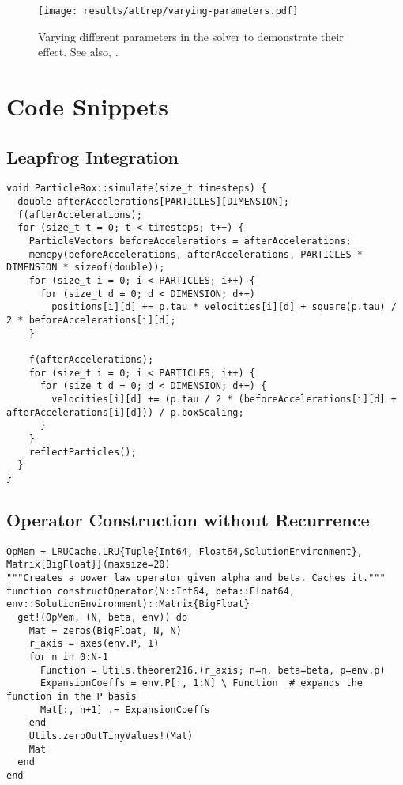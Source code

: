 \pagebreak
\begin{figure}[H]
  \centering
  \texttt{[image: results/attrep/varying-parameters.pdf]}
  \caption[Varying parameters in the solver]{
    Varying different parameters in the solver to demonstrate their effect.
    See also, .
  }
  \label{fig:varying-parameters}
\end{figure}
\pagebreak

\chapter{Code Snippets}
\label{appendix:code-snippets}

\section{Leapfrog Integration}
\begin{verbatim}
void ParticleBox::simulate(size_t timesteps) {
  double afterAccelerations[PARTICLES][DIMENSION];
  f(afterAccelerations);
  for (size_t t = 0; t < timesteps; t++) {
    ParticleVectors beforeAccelerations = afterAccelerations;
    memcpy(beforeAccelerations, afterAccelerations, PARTICLES * DIMENSION * sizeof(double));
    for (size_t i = 0; i < PARTICLES; i++) {
      for (size_t d = 0; d < DIMENSION; d++)
        positions[i][d] += p.tau * velocities[i][d] + square(p.tau) / 2 * beforeAccelerations[i][d];
    }

    f(afterAccelerations);
    for (size_t i = 0; i < PARTICLES; i++) {
      for (size_t d = 0; d < DIMENSION; d++) {
        velocities[i][d] += (p.tau / 2 * (beforeAccelerations[i][d] + afterAccelerations[i][d])) / p.boxScaling;
      }
    }
    reflectParticles();
  }
}
\end{verbatim}

\pagebreak
\section{Operator Construction without Recurrence}
\begin{verbatim}
OpMem = LRUCache.LRU{Tuple{Int64, Float64,SolutionEnvironment}, Matrix{BigFloat}}(maxsize=20)
"""Creates a power law operator given alpha and beta. Caches it."""
function constructOperator(N::Int64, beta::Float64, env::SolutionEnvironment)::Matrix{BigFloat}
  get!(OpMem, (N, beta, env)) do
    Mat = zeros(BigFloat, N, N)
    r_axis = axes(env.P, 1)
    for n in 0:N-1
      Function = Utils.theorem216.(r_axis; n=n, beta=beta, p=env.p)
      ExpansionCoeffs = env.P[:, 1:N] \ Function  # expands the function in the P basis
      Mat[:, n+1] .= ExpansionCoeffs
    end
    Utils.zeroOutTinyValues!(Mat)
    Mat
  end
end
\end{verbatim}
